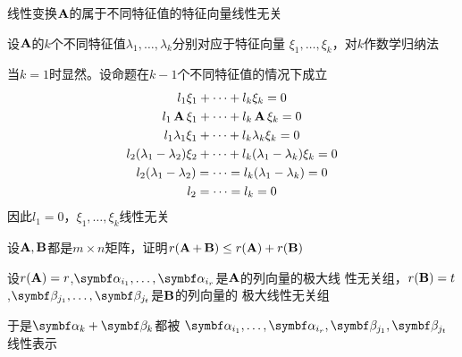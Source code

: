 \documentclass{article}
\begin{document}
\begin{examplle}[]
线性变换\(\operatorname{\textbf{A}}\)的属于不同特征值的特征向量线性无关

设\(\operatorname{\textbf{A}}\)的\(k\)个不同特征值\(\lambda_1,\dots,\lambda_k\)分别对应于特征向量
\(\xi_1,\dots,\xi_k\)，对\(k\)作数学归纳法

当\(k=1\)时显然。设命题在\(k-1\)个不同特征值的情况下成立
\begin{gather*}
l_1\xi_1+\dots+l_k\xi_k=0\\
l_1\operatorname{\textbf{A}}\xi_1+\dots+l_k\operatorname{\textbf{A}}\xi_k=0\\
l_1\lambda_1\xi_1+\dots+l_k\lambda_k\xi_k=0\\
l_2(\lambda_1-\lambda_2)\xi_2+\dots+l_k(\lambda_1-\lambda_k)\xi_k=0\\
l_2(\lambda_1-\lambda_2)=\cdots=l_k(\lambda_1-\lambda_k)=0\\
l_2=\dots=l_k=0
\end{gather*}
因此\(l_1=0\)，\(\xi_1,\dots,\xi_k\)线性无关
\end{examplle}

\begin{examplle}[]
设\(\operatorname{\textbf{A}},\operatorname{\textbf{B}}\)都是\(m\times n\)矩阵，证明\(r(\operatorname{\textbf{A}}+\operatorname{\textbf{B}})\le r(\operatorname{\textbf{A}})+r(\operatorname{\textbf{B}})\)

设\(r(\operatorname{\textbf{A}})=r\),\(\balpha_{i_1},\dots,\balpha_{i_r}\)是\(\operatorname{\textbf{A}}\)的列向量的极大线
性无关组，\(r(\operatorname{\textbf{B}})=t\),\(\bbeta_{j_1},\dots,\bbeta_{j_t}\)是\(\operatorname{\textbf{B}}\)的列向量的
极大线性无关组

于是\(\balpha_k+\bbeta_k\)都被
\(\balpha_{i_1},\dots,\balpha_{i_r},\bbeta_{j_1},\bbeta_{j_t}\)线性表示
\end{examplle}
\end{document}
